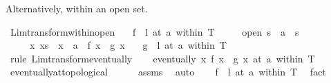 \begin{isabellebody}
%
\begin{isamarkuptext}%
Alternatively, within an open set.%
\end{isamarkuptext}\isamarkuptrue%
\isamarkupfalse%
\ Lim{\isacharunderscore}{\kern0pt}transform{\isacharunderscore}{\kern0pt}within{\isacharunderscore}{\kern0pt}open{\isacharcolon}{\kern0pt}\isanewline
\ \ \ {\isachardoublequoteopen}{\isacharparenleft}{\kern0pt}f\ {\isasymlonglongrightarrow}\ l{\isacharparenright}{\kern0pt}\ {\isacharparenleft}{\kern0pt}at\ a\ within\ T{\isacharparenright}{\kern0pt}{\isachardoublequoteclose}\isanewline
\ \ \ \ \ {\isachardoublequoteopen}open\ s{\isachardoublequoteclose}\ \ {\isachardoublequoteopen}a\ {\isasymin}\ s{\isachardoublequoteclose}\isanewline
\ \ \ \ \ {\isachardoublequoteopen}{\isasymAnd}x{\isachardot}{\kern0pt}\ x{\isasymin}s\ {\isasymLongrightarrow}\ x\ {\isasymnoteq}\ a\ {\isasymLongrightarrow}\ f\ x\ {\isacharequal}{\kern0pt}\ g\ x{\isachardoublequoteclose}\isanewline
\ \ \ {\isachardoublequoteopen}{\isacharparenleft}{\kern0pt}g\ {\isasymlonglongrightarrow}\ l{\isacharparenright}{\kern0pt}\ {\isacharparenleft}{\kern0pt}at\ a\ within\ T{\isacharparenright}{\kern0pt}{\isachardoublequoteclose}\isanewline
%
\isadelimproof
%
\endisadelimproof
%
\isatagproof
{}\isamarkupfalse%
\ {\isacharparenleft}{\kern0pt}rule\ Lim{\isacharunderscore}{\kern0pt}transform{\isacharunderscore}{\kern0pt}eventually{\isacharparenright}{\kern0pt}\isanewline
\ \ \isamarkupfalse%
\ {\isachardoublequoteopen}eventually\ {\isacharparenleft}{\kern0pt}{\isasymlambda}x{\isachardot}{\kern0pt}\ f\ x\ {\isacharequal}{\kern0pt}\ g\ x{\isacharparenright}{\kern0pt}\ {\isacharparenleft}{\kern0pt}at\ a\ within\ T{\isacharparenright}{\kern0pt}{\isachardoublequoteclose}\isanewline
\ \ \ \ \isamarkupfalse%
\ eventually{\isacharunderscore}{\kern0pt}at{\isacharunderscore}{\kern0pt}topological\isanewline
\ \ \ \ \isamarkupfalse%
\ assms\ \isamarkupfalse%
\ auto\isanewline
\ \ \isamarkupfalse%
\ {\isachardoublequoteopen}{\isacharparenleft}{\kern0pt}f\ {\isasymlonglongrightarrow}\ l{\isacharparenright}{\kern0pt}\ {\isacharparenleft}{\kern0pt}at\ a\ within\ T{\isacharparenright}{\kern0pt}{\isachardoublequoteclose}\ \isamarkupfalse%
\ fact\isanewline
{}\isamarkupfalse%
%
\endisatagproof
{\isafoldproof}%
%
\isadelimproof
%
\endisadelimproof
%
\begin{isamarkuptext}%

\end{isamarkuptext}
\end{isabellebody}
